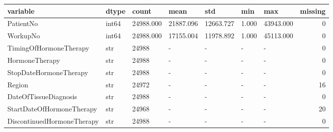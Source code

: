 \begin{tabular}{lllllllr}
\toprule
variable & dtype & count & mean & std & min & max & missing \\
\midrule
PatientNo & int64 & 24988.000 & 21887.096 & 12663.727 & 1.000 & 43943.000 & 0 \\
WorkupNo & int64 & 24988.000 & 17155.004 & 11978.892 & 1.000 & 45113.000 & 0 \\
TimingOfHormoneTherapy & str & 24988 & - & - & - & - & 0 \\
HormoneTherapy & str & 24988 & - & - & - & - & 0 \\
StopDateHormoneTherapy & str & 24988 & - & - & - & - & 0 \\
Region & str & 24972 & - & - & - & - & 16 \\
DateOfTissueDiagnosis & str & 24988 & - & - & - & - & 0 \\
StartDateOfHormoneTherapy & str & 24968 & - & - & - & - & 20 \\
DiscontinuedHormoneTherapy & str & 24988 & - & - & - & - & 0 \\
\bottomrule
\end{tabular}
